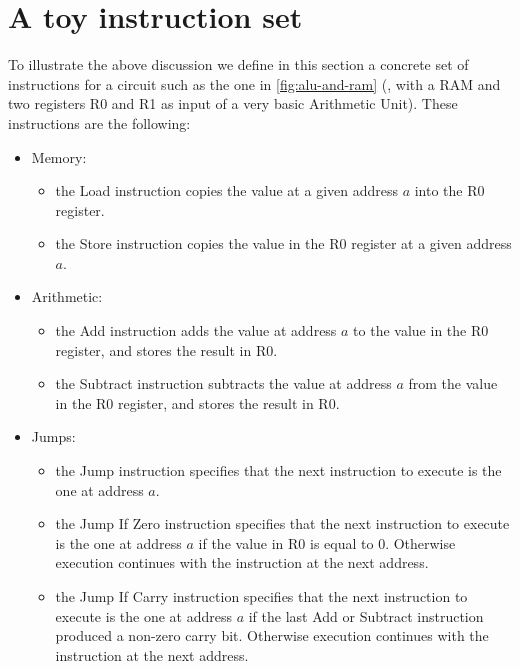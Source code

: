 \section{A toy instruction set}\label{section:toy-insn-set}

To illustrate the above discussion we define in this section a concrete set of
instructions for a circuit such as the one in \cref{fig:alu-and-ram} (\ie, with
a RAM and two registers R0 and R1 as input of a very basic Arithmetic Unit).
These instructions are the following:
\begin{itemize}
  \item Memory:

  \begin{itemize}
    \item the Load instruction copies the value at a given address $a$ into the
    R0 register.

    \item the Store instruction copies the value in the R0 register at a
    given address $a$.
  \end{itemize}

  \item Arithmetic:

  \begin{itemize}
    \item the Add instruction adds the value at address $a$ to the value in the
    R0 register, and stores the result in R0.

    \item the Subtract instruction subtracts the value at address $a$ from the
    value in the R0 register, and stores the result in R0.
  \end{itemize}

  \item Jumps:

  \begin{itemize}
    \item the Jump instruction specifies that the next instruction to execute
    is the one at address $a$.

    \item the Jump If Zero instruction specifies that the next instruction to
    execute is the one at address $a$ if the value in R0 is equal to $0$.
    Otherwise execution continues with the instruction at the next address.

    \item the Jump If Carry instruction specifies that the next instruction to
    execute is the one at address $a$ if the last Add or Subtract instruction
    produced a non-zero carry bit. Otherwise execution continues with the
    instruction at the next address.
  \end{itemize}


\end{itemize}
